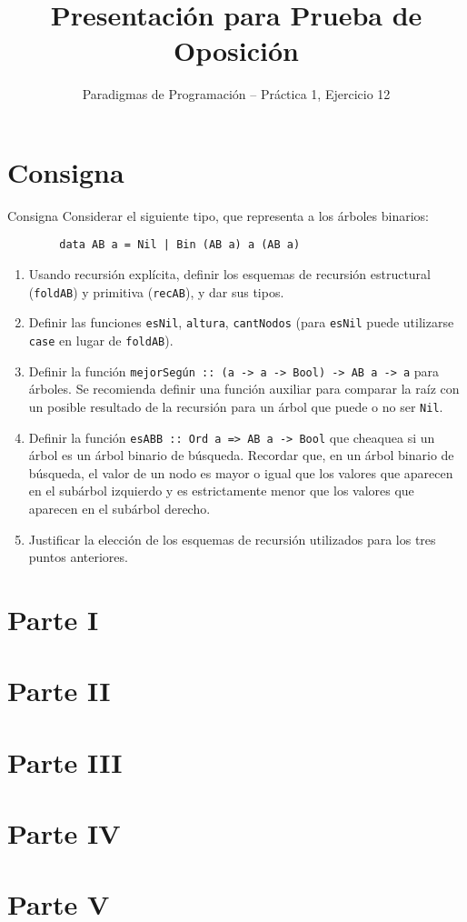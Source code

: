 \documentclass[8pt]{beamer}
\title{Presentación para Prueba de Oposición}
\subtitle{Paradigmas de Programación -- Práctica 1, Ejercicio 12}
\begin{document}
\newcommand{\code}[1]{\texttt{#1}}

\begin{frame}
    \titlepage
\end{frame}

\section{Consigna}

\begin{frame}[fragile]{Consigna}
    Considerar el siguiente tipo, que representa a los árboles binarios:
    \begin{verbatim}
        data AB a = Nil | Bin (AB a) a (AB a)
    \end{verbatim}

    \begin{enumerate}[I]
        \item<2-> Usando recursión explícita, definir los esquemas de recursión estructural (\code{foldAB}) y primitiva (\code{recAB}), y dar sus tipos.
        \item<3-> Definir las funciones \code{esNil}, \code{altura}, \code{cantNodos} (para \code{esNil} puede utilizarse \code{case} en lugar de \code{foldAB}).
        \item<4-> Definir la función \code{mejorSegún :: (a -> a -> Bool) -> AB a -> a} para árboles. Se recomienda definir una función auxiliar para comparar la raíz con un posible resultado de la recursión para un árbol que puede o no ser \code{Nil}.
        \item<5-> Definir la función \code{esABB :: Ord a => AB a -> Bool} que cheaquea si un árbol es un árbol binario de búsqueda. Recordar que, en un árbol binario de búsqueda, el valor de un nodo es mayor o igual que los valores que aparecen en el subárbol izquierdo y es estrictamente menor que los valores que aparecen en el subárbol derecho.
        \item<6-> Justificar la elección de los esquemas de recursión utilizados para los tres puntos anteriores.
    \end{enumerate}

\end{frame}

\section{Parte I}

\section{Parte II}

\section{Parte III}

\section{Parte IV}

\section{Parte V}
\end{document}
